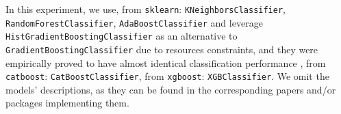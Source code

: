 In this experiment, we use, from \texttt{sklearn}: \texttt{KNeighborsClassifier}, \texttt{RandomForestClassifier},  \texttt{AdaBoostClassifier} and leverage \texttt{HistGradientBoostingClassifier} as an alternative to \texttt{GradientBoostingClassifier} due to resources constraints, and they were empirically proved to have almost identical classification performance \cite{sarker2025catboost, DI2024100368, Sanjaya2026.07.30.26359086}, from \texttt{catboost}: \texttt{CatBoostClassifier},
from \texttt{xgboost}: \texttt{XGBClassifier}. We omit the models' descriptions, as they can be found in the corresponding papers and/or packages implementing them.